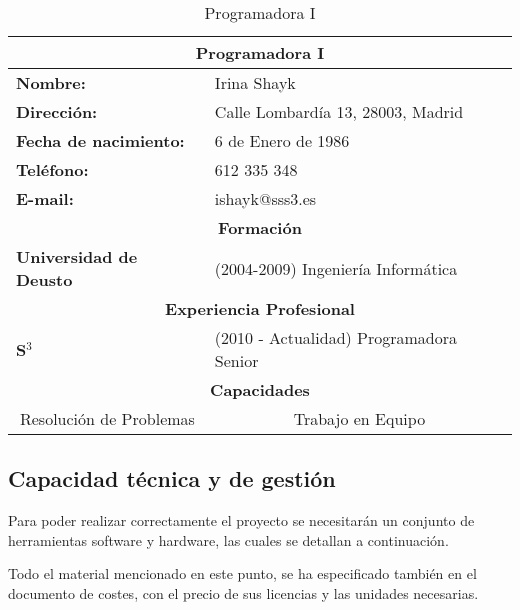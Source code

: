 \begin{table}[H]
\begin{center}
\begin{tabular}{p{} p{9cm}}
\multicolumn{2}{c}{\Large{\textbf{Programadora I}}} \\
\hline
\textbf{Nombre:} & Irina Shayk\\
\textbf{Dirección:} & Calle Lombardía 13, 28003, Madrid\\
\textbf{Fecha de nacimiento:} & 6 de Enero de 1986 \\
\textbf{Teléfono:} & 612 335 348\\
\textbf{E-mail:} & ishayk@sss3.es\\
\hline \hline
\multicolumn{2}{c}{\textbf{Formación} } \\
\hline
\textbf{Universidad de Deusto} &  (2004-2009) Ingeniería Informática\\
\hline \hline
\multicolumn{2}{c}{\textbf{Experiencia Profesional} } \\
\hline
\textbf{S$^3$} & (2010 - Actualidad)  Programadora Senior\\
\hline \hline
\multicolumn{2}{c}{\textbf{Capacidades} } \\
\hline
\multicolumn{1}{c}{Resolución de Problemas} & \multicolumn{1}{c}{Trabajo en Equipo} \\
\hline
\end{tabular}
\caption{Programadora I}
\label{tab:programadoraI}
\end{center}
\end{table}


\subsection{Capacidad técnica y de gestión}
\par{Para poder realizar correctamente el proyecto se necesitarán un conjunto de herramientas software y hardware, las cuales se detallan a continuación. }
\par{Todo el material mencionado en este punto, se ha especificado también en el documento de costes, con el precio de sus licencias y las unidades necesarias.}

